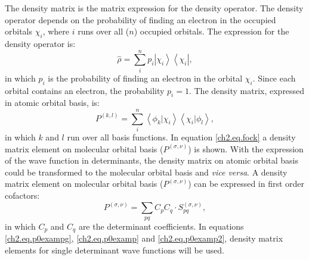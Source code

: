 The density matrix is the matrix expression for the density operator. The density operator depends on the probability of finding an electron in the occupied orbitals $\chi_i$, where $i$ runs over all ($n$) occupied orbitals. The expression for the density operator is:
\begin{equation}
\hat{\rho}=\sum_i^n p_i \left| \chi_i \right> \left< \chi_i \right|,
\end{equation}
in which $p_i$ is the probability of finding an electron in the orbital $\chi_i$. Since each orbital contains an electron, the probability $p_i = 1$. The density matrix, expressed in atomic orbital basis, is:
\begin{equation}
P^{(k,l)}=\sum_i^n \left< \phi_k | \chi_i \right> \left< \chi_i | \phi_l \right>,
\end{equation}
in which $k$ and $l$ run over all basis functions. In equation \ref{ch2.eq.fock} a density matrix element on molecular orbital basis ($P^{(\sigma,\nu)}$) is shown. With the expression of the wave function in determinants, the density matrix on atomic orbital basis could be transformed to the molecular orbital basis and \textit{vice versa}. A density matrix element on molecular orbital basis ($P^{(\sigma,\nu)}$) can be expressed in first order cofactors: 
\begin{equation}
P^{(\sigma,\nu)} = \sum_{pq} C_p C_q \cdot S^{(\sigma,\nu)}_{pq},
\end{equation}
in which $C_p$ and $C_q$ are the determinant coefficients. In equations \ref{ch2.eq.p0exampg}, \ref{ch2.eq.p0examp} and \ref{ch2.eq.p0examp2}, density matrix elements for single determinant wave functions will be used.


